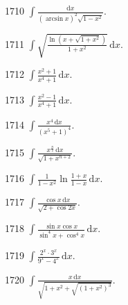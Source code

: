 \begin{prob}[S]{1710}
$\displaystyle\int \frac{\mathrm{d}x}{(\arcsin x)^2\sqrt{1 - x^2}}.$
\end{prob}

\begin{prob}[S]{1711}
$\displaystyle\int \sqrt{\frac{\ln(x + \sqrt{1 + x^2})}{1 + x^2}}\,\mathrm{d}x.$
\end{prob}

\begin{prob}[S]{1712}
$\displaystyle\int \frac{x^2 + 1}{x^4 + 1}\,\mathrm{d}x.$
\end{prob}

\begin{prob}[S]{1713}
$\displaystyle\int \frac{x^2 - 1}{x^4 + 1}\,\mathrm{d}x.$
\end{prob}

\begin{prob}[S]{1714}
$\displaystyle\int \frac{x^4\,\mathrm{d}x}{(x^5 + 1)^4}.$
\end{prob}

\begin{prob}[S]{1715}
$\displaystyle\int \frac{x^{\frac{n}{2}}\,\mathrm{d}x}{\sqrt{1 + x^{n+2}}}.$
\end{prob}

\begin{prob}[S]{1716}
$\displaystyle\int \frac{1}{1 - x^2}\ln\frac{1 + x}{1 - x}\,\mathrm{d}x.$
\end{prob}

\begin{prob}[S]{1717}
$\displaystyle\int \frac{\cos x\,\mathrm{d}x}{\sqrt{2 + \cos 2x}}.$
\end{prob}

\begin{prob}[S]{1718}
$\displaystyle\int \frac{\sin x\cos x}{\sin^4 x + \cos^4 x}\,\mathrm{d}x.$
\end{prob}

\begin{prob}[S]{1719}
$\displaystyle\int \frac{2^x \cdot 3^x}{9^x - 4^x}\,\mathrm{d}x.$
\end{prob}

\begin{prob}[S]{1720}
$\displaystyle\int \frac{x\,\mathrm{d}x}{\sqrt{1 + x^2 + \sqrt{(1 + x^2)^3}}}.$
\end{prob}


